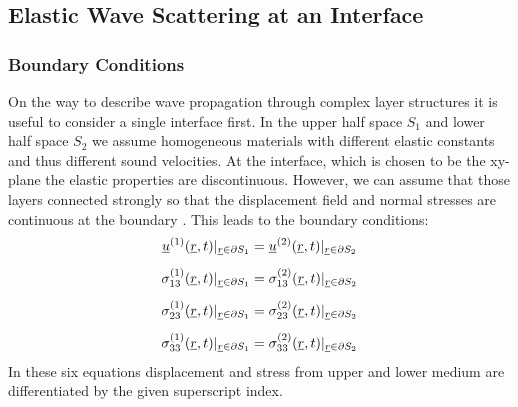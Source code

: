 \subsection{Elastic Wave Scattering at an Interface}

\subsubsection{Boundary Conditions}
On the way to describe wave propagation through complex layer structures it is
useful to consider a single interface first. In the upper half space $S_1$ and
lower half space $S_2$
we assume homogeneous materials with different elastic constants and thus
different sound velocities. At the interface, which is chosen to be the
xy-plane the elastic properties are discontinuous. However, we can assume that
those layers connected strongly so that the displacement field and normal
stresses are continuous at the boundary \cite[182,185]{achenbach1973wave}. This
leads to the boundary conditions:
\begin{align} \label{eq:boundaryconditions}
    \underline{u}^{(1)}(\underline{r}, t)|_{\underline{r}\in\partial S_1}   & =
    \underline{u}^{(2)}(\underline{r}, t)|_{\underline{r}\in\partial S_2}       \\[5pt]
    \sigma_{13}^{(1)}(\underline{r}, t)|_{\underline{r}\in\partial S_1} & =
    \sigma_{13}^{(2)}(\underline{r}, t)|_{\underline{r}\in\partial S_2}     \\[5pt]
    \sigma_{23}^{(1)}(\underline{r}, t)|_{\underline{r}\in\partial S_1} & =
    \sigma_{23}^{(2)}(\underline{r}, t)|_{\underline{r}\in\partial S_2}     \\[5pt]
    \sigma_{33}^{(1)}(\underline{r}, t)|_{\underline{r}\in\partial S_1} & =
    \sigma_{33}^{(2)}(\underline{r}, t)|_{\underline{r}\in\partial S_2}
\end{align}
In these six equations displacement and stress from upper and lower medium are
differentiated by the given superscript index.

